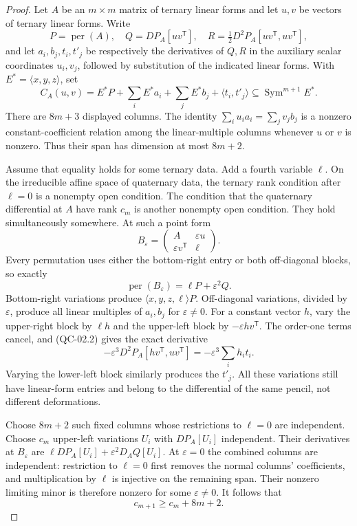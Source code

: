 \begin{proof}
Let $A$ be an $m\times m$ matrix of ternary linear forms and let
$u,v$ be vectors of ternary linear forms. Write
\[
 P=\operatorname{per}(A),\quad
 Q=DP_A[uv^{\mathsf T}],\quad
 R=\tfrac12D^2P_A[uv^{\mathsf T},uv^{\mathsf T}],
\]
and let $a_i,b_j,t_i,t'_j$ be respectively the derivatives of $Q,R$
in the auxiliary scalar coordinates $u_i,v_j$, followed by substitution
of the indicated linear forms. With $E^*=\langle x,y,z\rangle$, set
\[
 C_A(u,v)=E^*P+\sum_iE^*a_i+\sum_jE^*b_j+
                   \langle t_i,t'_j\rangle
       \subseteq\operatorname{Sym}^{m+1}E^*.
 \tag{QC-02.1}
\]
There are $8m+3$ displayed columns. The identity
$\sum_i u_i a_i=\sum_jv_jb_j$ is a nonzero constant-coefficient
relation among the linear-multiple columns whenever $u$ or $v$
is nonzero. Thus their span has dimension at most $8m+2$.

Assume that equality holds for some ternary data. Add a fourth
variable $\ell$. On the irreducible affine space of quaternary data,
the ternary rank condition after $\ell=0$ is a nonempty open
condition. The condition that the quaternary differential at $A$
have rank $c_m$ is another nonempty open condition. They hold
simultaneously somewhere. At such a point form
\[
 B_\varepsilon=\begin{pmatrix}A&\varepsilon u\\
                  \varepsilon v^{\mathsf T}&\ell\end{pmatrix}.
\]
Every permutation uses either the bottom-right entry or both
off-diagonal blocks, so exactly
\[
 \operatorname{per}(B_\varepsilon)=\ell P+\varepsilon^2Q.
 \tag{QC-02.2}
\]
Bottom-right variations produce $\langle x,y,z,\ell\rangle P$.
Off-diagonal variations, divided by $\varepsilon$, produce all
linear multiples of $a_i,b_j$ for $\varepsilon\ne0$.
For a constant vector $h$, vary the upper-right block by $\ell h$
and the upper-left block by $-\varepsilon hv^{\mathsf T}$.
The order-one terms cancel, and (QC-02.2) gives the exact derivative
\[
 -\varepsilon^3D^2P_A[hv^{\mathsf T},uv^{\mathsf T}]
             =-\varepsilon^3\sum_i h_i t_i.
\]
Varying the lower-left block similarly produces the $t'_j$.
All these variations still have linear-form entries and belong to
the differential of the same pencil, not different deformations.

Choose $8m+2$ such fixed columns whose restrictions to $\ell=0$
are independent. Choose $c_m$ upper-left variations $U_i$ with
$DP_A[U_i]$ independent. Their derivatives at $B_\varepsilon$ are
$\ell DP_A[U_i]+\varepsilon^2D_AQ[U_i]$.
At $\varepsilon=0$ the combined columns are independent: restriction
to $\ell=0$ first removes the normal columns' coefficients, and
multiplication by $\ell$ is injective on the remaining span.
Their nonzero limiting minor is therefore nonzero for some
$\varepsilon\ne0$. It follows that
\[
 c_{m+1}\geq c_m+8m+2.\tag{QC-02.3}
\]


\end{proof}
